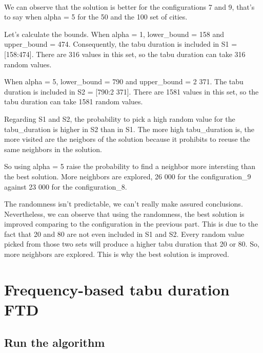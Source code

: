 \documentclass[12pt,oneside,a4paper]{article}
\begin{document}
\paragraph{}
We can observe that the solution is better for the configurations 7 and 9, that's to say when
alpha = 5 for the 50 and the 100 set of cities.

Let's calculate the bounds.
When alpha = 1, lower\_bound = 158 and upper\_bound = 474.
Consequently, the tabu duration is included in S1 = [158:474].
There are 316 values in this set, so the tabu duration can take 316 random values.

When alpha = 5, lower\_bound = 790 and upper\_bound = 2 371.
The tabu duration is included in S2 = [790:2 371].
There are 1581 values in this set, so the tabu duration can take 1581 random values.

Regarding S1 and S2, the probability to pick a high random value for the tabu\_duration is higher in S2 than in S1.
The more high tabu\_duration is, the more visited are the neigbors of the solution because it prohibits to reeuse the
same neighbors in the solution.

So using alpha = 5 raise the probability to find a neighbor more intersting than the best solution. More neighbors
are explored, 26 000 for the configuration\_9 against 23 000 for the configuration\_8.

The randomness isn’t predictable, we can’t really make assured conclusions.
Nevertheless, we can observe that using the randomness, the best solution is improved comparing to the configuration
in the previous part. This is due to the fact that 20 and 80 are not even included in S1 and S2.
Every random value picked from those two sets will produce a higher tabu duration that 20 or 80.
So, more neighbors are explored. This is why the best solution is improved.

\newpage
\section{Frequency-based tabu duration FTD}

\subsection{Run the algorithm}
\end{document}
